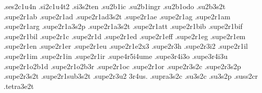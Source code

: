 {.ses2c1u4n                         %
.si2c1u4t2                        %
.si3s2ten                         %
.su2b1ic                          %
.su2b1ingr                        %
.su2b1odo                         %
.su2b3s2t                         %
.supe2r1ab                        %
.supe2r1ad                        %
.supe2r1ad3s2t                    %
.supe2r1ae                        %
.supe2r1ag                        %
.supe2r1am                        %
.supe2r1arg                       %
.supe2r1a3s2p                     %
.supe2r1a3s2t                     %
.supe2r1att                       %
.supe2r1bib                       %
.supe2r1bif                       %
.supe2r1bil                       %
.supe2r1c                         %
.supe2r1d                         %
.supe2r1ed                        %
.supe2r1eff                       %
.supe2r1eg                        %
.supe2r1em                        %
.supe2r1en                        %
.supe2r1er                        %
.supe2r1eu                        %
.supe2r1e2x3                      %
.supe2r3h                         %
.supe2r3i2                        %
.supe2r1il                        %
.supe2r1im                        %
.supe2r1in                        %
.supe2r1ir                        %
.supe4r5i4ume                     %
.supe3r4i3o .supe3r4i3u           %
.supe2r1o2b1d                     %
.supe2r1o2b3r                     %
.supe2r1oc                        %
.supe2r1or                        %
.supe2r3s2c                       %
.supe2r3s2p                       %
.supe2r3s2t                       %
.supe2r1sub3s2t                   %
.supe2r3u2                        %
3r4us.                            %
.supra3s2c                        %
.su3s2c .su3s2p                   %
.suss2cr                          %
.tetra3e2t                        %
}
